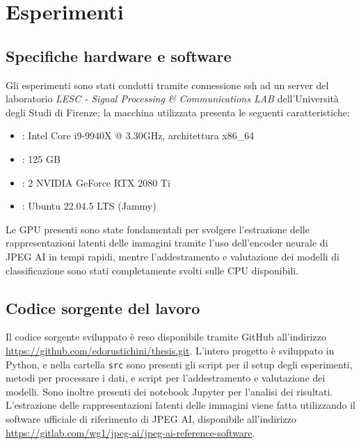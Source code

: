 \chapter{Esperimenti}\label{ch:exp}
\section{Specifiche hardware e software}
Gli esperimenti sono stati condotti tramite connessione ssh ad un server del laboratorio \textit{LESC - Signal Processing \& Communications LAB} dell'Università degli Studi di Firenze; la macchina utilizzata presenta le seguenti caratteristiche:
\begin{itemize}
    \item {}: Intel Core i9-9940X @ 3.30GHz, architettura x86\_64
    \item {}: 125 GB
    \item {}: 2 NVIDIA GeForce RTX 2080 Ti
    \item {}: Ubuntu 22.04.5 LTS (Jammy)
\end{itemize}
Le GPU presenti sono state fondamentali per svolgere l'estrazione delle rappresentazioni latenti delle immagini tramite l'uso dell'encoder neurale di JPEG AI in tempi rapidi, mentre l'addestramento e valutazione dei modelli di classificazione sono stati completamente svolti sulle CPU disponibili.
\section{Codice sorgente del lavoro}
Il codice sorgente sviluppato è reso disponibile tramite GitHub all'indirizzo \url{https://github.com/edorustichini/thesis.git}. L'intero progetto è sviluppato in Python, e nella cartella \texttt{src} sono presenti gli script per il setup degli esperimenti, metodi per processare i dati, e script per l'addestramento e valutazione dei modelli. Sono inoltre presenti dei notebook Jupyter per l'analisi dei risultati.\\
L'estrazione delle rappresentazioni latenti delle immagini viene fatta utilizzando il software  ufficiale di riferimento di JPEG AI, disponibile all'indirizzo \url{https://gitlab.com/wg1/jpeg-ai/jpeg-ai-reference-software}.

